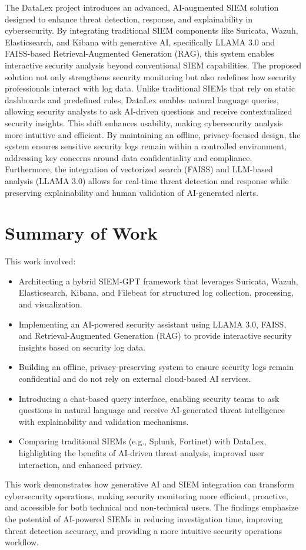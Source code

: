 The DataLex project introduces an advanced, AI-augmented SIEM solution designed to enhance threat detection, response, and explainability in cybersecurity. By integrating traditional SIEM components like Suricata, Wazuh, Elasticsearch, and Kibana with generative AI, specifically LLAMA 3.0 and FAISS-based Retrieval-Augmented Generation (RAG), this system enables interactive security analysis beyond conventional SIEM capabilities. The proposed solution not only strengthens security monitoring but also redefines how security professionals interact with log data. Unlike traditional SIEMs that rely on static dashboards and predefined rules, DataLex enables natural language queries, allowing security analysts to ask AI-driven questions and receive contextualized security insights. This shift enhances usability, making cybersecurity analysis more intuitive and efficient. By maintaining an offline, privacy-focused design, the system ensures sensitive security logs remain within a controlled environment, addressing key concerns around data confidentiality and compliance. Furthermore, the integration of vectorized search (FAISS) and LLM-based analysis (LLAMA 3.0) allows for real-time threat detection and response while preserving explainability and human validation of AI-generated alerts.

\section{Summary of Work}
\label{sec_summary_of_work}

This work involved:

\begin{itemize}
    \item Architecting a hybrid SIEM-GPT framework that leverages Suricata, Wazuh, Elasticsearch, Kibana, and Filebeat for structured log collection, processing, and visualization.
    \item Implementing an AI-powered security assistant using LLAMA 3.0, FAISS, and Retrieval-Augmented Generation (RAG) to provide interactive security insights based on security log data.
    \item Building an offline, privacy-preserving system to ensure security logs remain confidential and do not rely on external cloud-based AI services.
    \item Introducing a chat-based query interface, enabling security teams to ask questions in natural language and receive AI-generated threat intelligence with explainability and validation mechanisms.
    \item Comparing traditional SIEMs (e.g., Splunk, Fortinet) with DataLex, highlighting the benefits of AI-driven threat analysis, improved user interaction, and enhanced privacy.
\end{itemize}

This work demonstrates how generative AI and SIEM integration can transform cybersecurity operations, making security monitoring more efficient, proactive, and accessible for both technical and non-technical users. The findings emphasize the potential of AI-powered SIEMs in reducing investigation time, improving threat detection accuracy, and providing a more intuitive security operations workflow.
